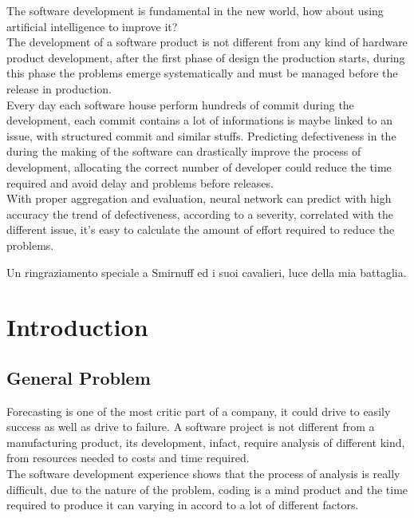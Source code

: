 \documentclass[%
    corpo=12pt,
    twoside,
    oldstyle,
    autoretitolo,
    greek,
    evenboxes,
]{toptesi}
\begin{document}
The software development is fundamental in the new world, how about using artificial intelligence to improve it?\\
The development of a software product is not different from any kind of hardware product development, after the first phase of design the production starts, during this phase the problems emerge systematically and must be managed before the release in production.\\
Every day each software house perform hundreds of commit during the development, each commit contains a lot of informations is maybe linked to an issue, with structured commit and similar stuffs. Predicting defectiveness in the during the making of the software can drastically improve the process of development, allocating the correct number of developer could reduce the time required and avoid delay and problems before releases.\\
With proper aggregation and evaluation, neural network can predict with high accuracy the trend of defectiveness, according to a severity, correlated with the different issue, it's easy to calculate the amount of effort required to reduce the problems.


\acknowledgements

Un ringraziamento speciale a Smirnuff ed i suoi cavalieri, luce della mia battaglia.

\indici

\mainmatter


\chapter{Introduction}
\label{chap:intro}
\section{General Problem}
Forecasting is one of the most critic part of a company, it could drive to easily success as well as drive to failure. A software project is not different from a manufacturing product, its development, infact, require analysis of different kind, from resources needed to costs and time required.\\
The software development experience shows that the process of analysis is really difficult, due to the nature of the problem, coding is a mind product and the time required to produce it can varying in accord to a lot of different factors.
\end{document}
